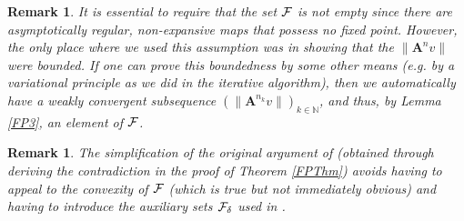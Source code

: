 \documentclass[10pt]{article}
\newtheorem{remark}[theorem]{Remark}
\def\A{\mathbf{A}}
\begin{document}
\begin{remark}
{\rm It is essential to require that the set $\cal F$ is not empty since
there are
asymptotically regular, non-expansive maps that possess no fixed point.
However, the only place where we used this assumption was in showing that the
$\|\A ^n v \|$ were bounded. If one can prove this boundedness by
some other means (e.g. by a variational principle as we did in the iterative
algorithm), then we automatically have a weakly convergent subsequence
$(\|\A ^{n_k} v\|)_{k\in \mathbb{N}}$, and thus, by Lemma
\ref{FP3}, an element of $\cal F$.}
\end{remark}

\begin{remark}
{\rm The simplification of the original argument of \cite{Opi67}
(obtained through
deriving the contradiction in the proof of Theorem \ref{FPThm}) avoids having
to appeal to the convexity of $\cal F$ (which is true but not immediately
obvious) and having to introduce the auxiliary sets $\cal F_\delta$ used in
\cite{Opi67}.}
\end{remark}
\end{document}
